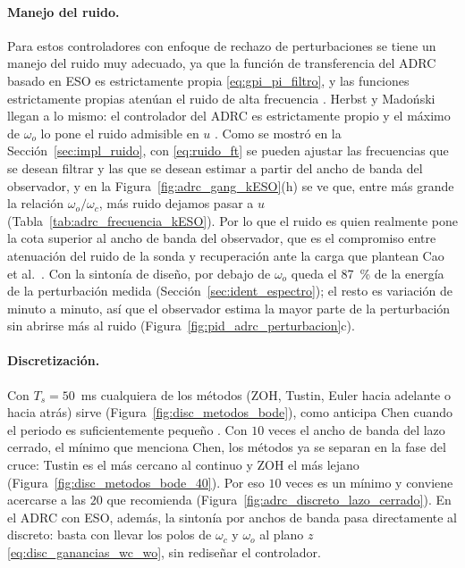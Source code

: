 \paragraph{Manejo del ruido.} Para estos controladores con enfoque de rechazo de perturbaciones se
tiene un manejo del ruido muy adecuado, ya que la función de transferencia del ADRC basado en ESO es
estrictamente propia \eqref{eq:gpi_pi_filtro}, y las funciones estrictamente propias atenúan el ruido
de alta frecuencia \cite[pp.~31--32]{chen1993analog}. Herbst y Madoński llegan a lo mismo: el
controlador del ADRC es estrictamente propio y el máximo de $\omega_o$ lo pone el ruido admisible en
$u$ \cite[ecs.~4.20 y 6.30]{herbst2024adrc}. Como se mostró en la Sección~\ref{sec:impl_ruido}, con
\eqref{eq:ruido_ft} se pueden ajustar las frecuencias que se desean filtrar y las que se desean estimar
a partir del ancho de banda del observador, y en la Figura~\ref{fig:adrc_gang_kESO}(h) se ve que, entre
más grande la relación $\omega_o/\omega_c$, más ruido dejamos pasar a $u$
(Tabla~\ref{tab:adrc_frecuencia_kESO}). Por lo que el ruido es quien realmente
pone la cota superior al ancho de banda del observador, que es el compromiso entre atenuación del ruido
de la sonda y recuperación ante la carga que plantean Cao et al.\ \cite{cao2025cascaded}. Con la
sintonía de diseño, por debajo de $\omega_o$ queda el 87~\% de la energía de la perturbación medida
(Sección~\ref{sec:ident_espectro}); el resto es variación de minuto a minuto, así que el observador
estima la mayor parte de la perturbación sin abrirse más al ruido (Figura~\ref{fig:pid_adrc_perturbacion}c).

\paragraph{Discretización.} Con $T_s = 50$~ms cualquiera de los métodos (ZOH, Tustin, Euler hacia
adelante o hacia atrás) sirve (Figura~\ref{fig:disc_metodos_bode}), como anticipa Chen cuando el
periodo es suficientemente pequeño \cite[sec.~13.3.1]{chen1993analog}. Con $10$ veces el ancho de banda
del lazo cerrado, el mínimo que menciona Chen, los métodos ya se separan en la fase del cruce: Tustin
es el más cercano al continuo y ZOH el más lejano (Figura~\ref{fig:disc_metodos_bode_40}). Por eso
$10$ veces es un mínimo y conviene acercarse a las $20$ que recomienda
(Figura~\ref{fig:adrc_discreto_lazo_cerrado}). En el ADRC con ESO, además, la sintonía por anchos de
banda pasa directamente al discreto: basta con llevar los polos de $\omega_c$ y $\omega_o$ al plano $z$
\eqref{eq:disc_ganancias_wc_wo}, sin rediseñar el controlador.


